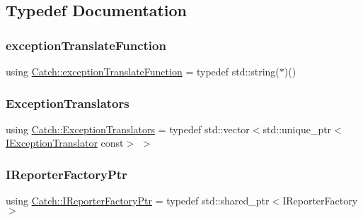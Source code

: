 \subsection{Typedef Documentation}
\mbox{\label{namespaceCatch_ae8d8673884dc36b98875106322a2a37b}} 
\subsubsection{\texorpdfstring{exception\+Translate\+Function}{exceptionTranslateFunction}}
{\footnotesize\ttfamily using \mbox{\hyperlink{namespaceCatch_ae8d8673884dc36b98875106322a2a37b}{Catch\+::exception\+Translate\+Function}} = typedef std\+::string($\ast$)()}

\mbox{\label{namespaceCatch_a7ad07967e688fdc03cf784f58be4b741}} 
\subsubsection{\texorpdfstring{Exception\+Translators}{ExceptionTranslators}}
{\footnotesize\ttfamily using \mbox{\hyperlink{namespaceCatch_a7ad07967e688fdc03cf784f58be4b741}{Catch\+::\+Exception\+Translators}} = typedef std\+::vector$<$std\+::unique\+\_\+ptr$<$\mbox{\hyperlink{structCatch_1_1IExceptionTranslator}{I\+Exception\+Translator}} const$>$ $>$}

\mbox{\label{namespaceCatch_ad1b36ac40c2739e52fd453dcdddf0d09}} 
\subsubsection{\texorpdfstring{I\+Reporter\+Factory\+Ptr}{IReporterFactoryPtr}}
{\footnotesize\ttfamily using \mbox{\hyperlink{namespaceCatch_ad1b36ac40c2739e52fd453dcdddf0d09}{Catch\+::\+I\+Reporter\+Factory\+Ptr}} = typedef std\+::shared\+\_\+ptr$<$I\+Reporter\+Factory$>$}

\mbox{\label{namespaceCatch_afa04ebe8e9423240c9585f7101a82ddf}} 
